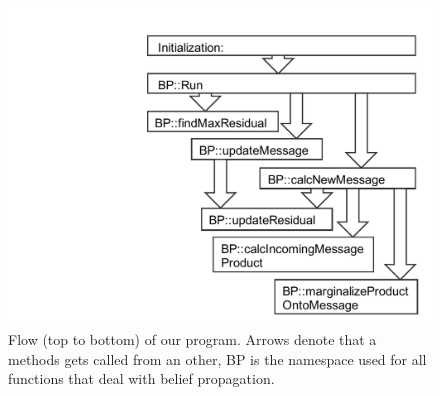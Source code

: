 \begin{figure}\centering
    \includegraphics[scale=0.5, trim={6.45cm 0cm 0 1.25cm},clip]{graphics/loopybp-compact.pdf}
  \caption{Flow (top to bottom) of our program. Arrows denote that a methods gets called from an other, BP is the namespace used for all functions that deal with belief propagation.\label{overviewflow}}
\end{figure}


